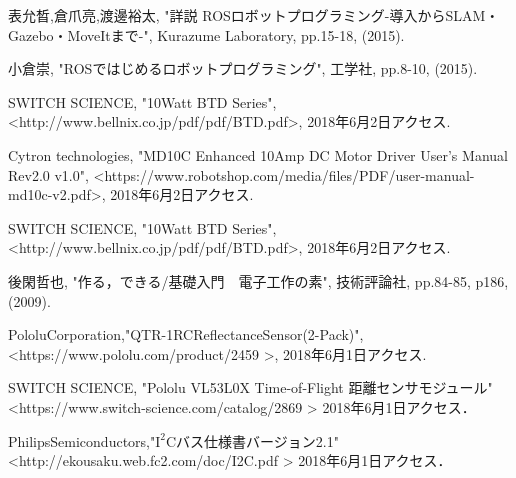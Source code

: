 \documentclass[11pt,a4j]{jarticle}
\begin{document}
\newpage


\newpage

\clearpage

\newpage

\newpage

\newpage

\newpage


\newpage
\begin{thebibliography}{9}
    表允晳,倉爪亮,渡邊裕太, "詳説 ROSロボットプログラミング-導入からSLAM・Gazebo・MoveItまで-", 
    Kurazume Laboratory, pp.15-18, (2015).

    小倉崇, "ROSではじめるロボットプログラミング", 工学社, pp.8-10, (2015).
  
  SWITCH SCIENCE, "10Watt BTD Series", 
  \textless http://www.bellnix.co.jp/pdf/pdf/BTD.pdf\textgreater , 2018年6月2日アクセス.
  
  Cytron technologies, "MD10C Enhanced 10Amp DC Motor Driver User's Manual Rev2.0 v1.0", 
  \textless https://www.robotshop.com/media/files/PDF/user-manual-md10c-v2.pdf\textgreater , 2018年6月2日アクセス.
  
  SWITCH SCIENCE, "10Watt BTD Series", 
  \textless http://www.bellnix.co.jp/pdf/pdf/BTD.pdf\textgreater , 2018年6月2日アクセス.
  
  後閑哲也, "作る，できる/基礎入門　電子工作の素", 技術評論社, pp.84-85, p186, (2009).
    
   Pololu\quad Corporation,\quad "QTR-1RC\quad Reflectance\quad Sensor(2-Pack)",
   \textless https://www.pololu.com/product/2459 \textgreater , 2018年6月1日アクセス.
   
  SWITCH SCIENCE, "Pololu VL53L0X Time-of-Flight 距離センサモジュール"
  \textless https://www.switch-science.com/catalog/2869 \textgreater
  2018年6月1日アクセス．
  
  Philips\quad Semiconductors,\quad "$\mathrm{I^2C}$\hspace{0.5em}バス仕様書バージョン2.1"　　　　　　　　　　
  \textless http://ekousaku.web.fc2.com/doc/I2C.pdf \textgreater
  \quad 2018年6月1日アクセス．
  

\end{thebibliography}
\end{document}
